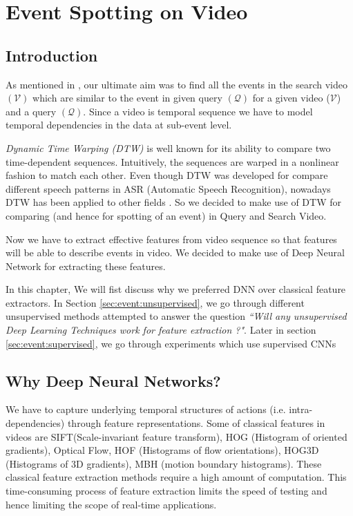 \chapter{Event Spotting on Video}
\label{chap:event}

\section{Introduction}
As mentioned in , our ultimate aim was to find all the events in the search video $(\mathcal{V})$ which are similar to the event in given query $(\mathcal{Q})$  for a given video ($\mathcal{V}$) and a query $(\mathcal{Q})$. Since a video is temporal sequence we have to model temporal dependencies
in the data at sub-event level. 

\textit{Dynamic Time Warping (DTW)} is well known for its ability to compare two time-dependent sequences. Intuitively, the sequences are warped in a nonlinear fashion to match each other. Even though DTW was developed for compare different speech patterns in ASR (Automatic Speech Recognition), nowadays DTW has been applied to other fields \cite{muller2007information}.  So we decided to make use of DTW for comparing (and hence for spotting of an event) in Query and Search Video.

Now we have to extract effective features from video sequence so that features will be able to describe events  in video. We decided to make use of Deep Neural Network for extracting these features. 

In this chapter, We will fist discuss why we preferred  DNN over classical feature extractors. In Section \ref{sec:event:unsupervised}, we go through different unsupervised methods attempted to answer the question \textit{``Will any unsupervised Deep Learning Techniques work for feature extraction ?"}. Later in section \ref{sec:event:supervised}, we go through experiments which use supervised CNNs  

\section{Why Deep Neural Networks?}
\label{sec:event:why}
We have to capture underlying temporal structures of actions (i.e. intra-dependencies) through feature representations. Some of classical features in videos are SIFT(Scale-invariant feature transform), HOG (Histogram of oriented gradients), Optical Flow, HOF (Histograms of flow orientations), HOG3D (Histograms of 3D gradients), MBH (motion boundary histograms). These classical feature extraction methods require a high amount of computation\cite{baker2011database,chatfield2011devil}. This time-consuming process of feature extraction limits the speed of testing and hence limiting the scope of real-time applications.


